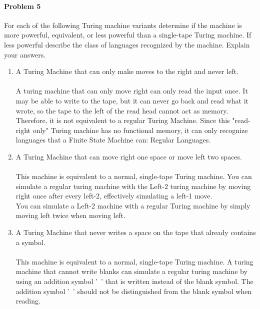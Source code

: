 \documentclass{article}
\begin{document}
    


\paragraph{Problem 5} For each of the following Turing machine variants determine if the machine
is more powerful, equivalent, or less powerful than a single-tape Turing machine. If less powerful
describe the class of languages recognized by the machine. Explain your answers.
\begin{enumerate}[\indent a)]
    \item A Turing Machine that can only make moves to the right and never left.
	\paragraph{} A turing machine that can only move right can only read the input once. It may be able to write to the tape, but it can never go back and read what it wrote, so the tape to the left of the read head cannot act as memory. Therefore, it is not equivalent to a regular Turing Machine. Since this "read-right only" Turing machine has no functional memory, it can only recognize languages that a Finite State Machine can: Regular Languages.
    
    \item A Turing Machine that can move right one space or move left two spaces.
    \paragraph{} This machine is equivalent to a normal, single-tape Turing machine. You can simulate
    a regular turing machine with the Left-2 turing machine by moving right once after every left-2, effectively 
    simulating a left-1 move.
    \\You can simulate a Left-2 machine with a regular Turing machine by simply moving left twice when moving left.
    \item A Turing Machine that never writes a space on the tape that already contains a symbol.
    \paragraph{} This machine is equivalent to a normal, single-tape Turing machine. A turing machine that cannot 
    write blanks can simulate a regular turing machine by using an addition symbol '~' that is written instead of the blank symbol.
    The addition symbol '~' should not be distinguished from the blank symbol when reading.
    
\end{enumerate}
\end{document}
